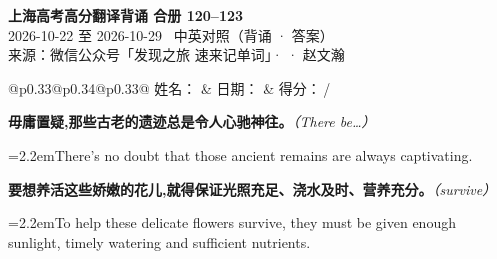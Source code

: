 \documentclass[11pt,a4paper]{article}
\newcommand{\num}[1]{\makebox[1.9em][r]{#1.}\hspace{0.3em}}
\newcommand{\prompt}[1]{\emph{\textcolor{tipblue}{\small（#1）}}}
\begin{document}
\pagestyle{plain}
\begin{center}
{\LARGE\bfseries 上海高考高分翻译背诵 \quad 合册 120–123}\\[0.25em]
{\large 2026-10-22 至 2026-10-29 \quad\ 中英对照（背诵 · 答案）}\\[0.35em]
{\footnotesize 来源：微信公众号「发现之旅 速来记单词」·  · 赵文瀚}
\end{center}

\vspace{0.4em}
\noindent\begin{tabular}{@{}p{0.33\textwidth}@{}p{0.34\textwidth}@{}p{0.33\textwidth}@{}}
姓名：\underline{\hspace{2.0cm}} & 日期：\underline{\hspace{2.0cm}} & 得分：\underline{\hspace{1.4cm}}\,/ \\
\end{tabular}

\vspace{0.5em}

\vspace{0.8em}
\vspace{0.35em}\vspace{0.15em}

\begin{minipage}{\linewidth}

\num{1}\textbf{毋庸置疑,那些古老的遗迹总是令人心驰神往。}\prompt{There be…}

\vspace{0.15em}

\noindent\hangindent=2.2em\hspace{2.2em}There’s no doubt that those ancient remains are always captivating.

\end{minipage}

\begin{minipage}{\linewidth}

\num{2}\textbf{要想养活这些娇嫩的花儿,就得保证光照充足、浇水及时、营养充分。}\prompt{survive}

\vspace{0.15em}

\noindent\hangindent=2.2em\hspace{2.2em}To help these delicate flowers survive, they must be given enough sunlight, timely watering and sufficient nutrients.

\end{minipage}
\end{document}
